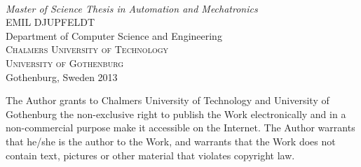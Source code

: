 \begin{titlepage}

\mbox{}
\vfill
\addtolength{\voffset}{2cm}
\begin{flushleft}
	{ \\[0.5cm]
	\emph{\Large Master of Science Thesis in Automation and Mechatronics} \\[.8cm]
	
	{\huge EMIL DJUPFELDT}\\[.8cm]
	
	{\Large Department of Computer Science and Engineering\\
	\textsc{Chalmers University of Technology} \\
	\textsc{University of Gothenburg} \\
	Gothenburg, Sweden 2013 \\
	} 
	}
\end{flushleft}

\end{titlepage}
\ClearShipoutPicture


\pagestyle{empty}
\newpage
\clearpage
The Author grants to Chalmers University of Technology and University of Gothenburg  the non-exclusive right to publish the Work electronically and in a non-commercial purpose make it accessible on the Internet. 
The Author warrants that he/she is the author to the Work, and warrants that the Work does not contain text, pictures or other material that violates copyright law.

